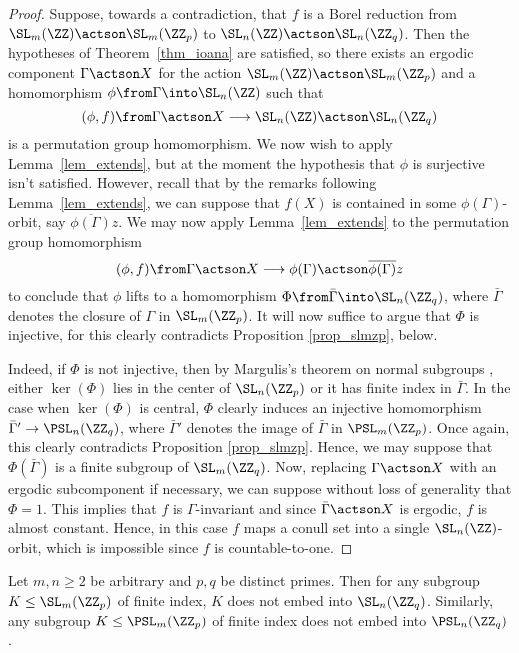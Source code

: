 \documentclass[oneside,leqno,11pt]{amsart}
\begin{document}
\begin{proof}
  Suppose, towards a contradiction, that $f$ is a Borel reduction from
  $\SL_m(\ZZ)\actson\SL_m(\ZZ_p)$ to $\SL_n(\ZZ)\actson\SL_n(\ZZ_q)$.
  Then the hypotheses of Theorem~\ref{thm_ioana} are satisfied, so
  there exists an ergodic component $\Gamma\actson X$ for the action
  $\SL_m(\ZZ)\actson\SL_m(\ZZ_p)$ and a homomorphism
  $\phi\from\Gamma\into\SL_n(\ZZ)$ such that
  \[(\phi,f)\from\Gamma\actson
  X\longrightarrow\SL_n(\ZZ)\actson\SL_n(\ZZ_q)
  \]
  is a permutation group homomorphism.  We now wish to apply
  Lemma~\ref{lem_extends}, but at the moment the hypothesis that
  $\phi$ is surjective isn't satisfied.  However, recall that by the
  remarks following Lemma~\ref{lem_extends}, we can suppose that
  $f(X)$ is contained in some $\phi(\Gamma)$-orbit, say
  $\overline{\phi(\Gamma)}z$.  We may now apply
  Lemma~\ref{lem_extends} to the permutation group homomorphism
  \[(\phi,f)\from
  \Gamma\actson X\longrightarrow\phi(\Gamma)\actson\overline{\phi(\Gamma)}z
  \]
  to conclude that $\phi$ lifts to a homomorphism
  $\Phi\from\bar\Gamma\into\SL_n(\ZZ_q)$, where $\bar\Gamma$ denotes
  the closure of $\Gamma$ in $\SL_m(\ZZ_p)$.  It will now suffice to
  argue that $\Phi$ is injective, for this clearly contradicts
  Proposition \ref{prop_slmzp}, below.

  Indeed, if $\Phi$ is not injective, then by Margulis's theorem on
  normal subgroups \cite[Theorem~8.1.2]{zimmer}, either $\ker(\Phi)$
  lies in the center of $\SL_n(\ZZ_p)$ or it has finite index in
  $\bar\Gamma$.  In the case when $\ker(\Phi)$ is central, $\Phi$
  clearly induces an injective homomorphism
  $\bar\Gamma'\rightarrow\PSL_n(\ZZ_q)$, where $\bar\Gamma'$ denotes
  the image of $\bar\Gamma$ in $\PSL_m(\ZZ_p)$.  Once again, this
  clearly contradicts Proposition \ref{prop_slmzp}.  Hence, we may
  suppose that $\Phi(\bar\Gamma)$ is a finite subgroup of
  $\SL_m(\ZZ_q)$.  Now, replacing $\Gamma\actson X$ with an ergodic
  subcomponent if necessary, we can suppose without loss of generality
  that $\Phi=1$.  This implies that $f$ is $\Gamma$-invariant and
  since $\bar\Gamma\actson X$ is ergodic, $f$ is almost constant.
  Hence, in this case $f$ maps a conull set into a single
  $\SL_n(\ZZ)$-orbit, which is impossible since $f$ is
  countable-to-one.
\end{proof}

\begin{prop}
  \label{prop_slmzp}
  Let $m,n\geq2$ be arbitrary and $p,q$ be distinct primes.  Then for
  any subgroup $K\leq\SL_m(\ZZ_p)$ of finite index, $K$ does not embed
  into $\SL_n(\ZZ_q)$.  Similarly, any subgroup $K\leq\PSL_m(\ZZ_p)$
  of finite index does not embed into $\PSL_n(\ZZ_q)$.
\end{prop}
\end{document}
